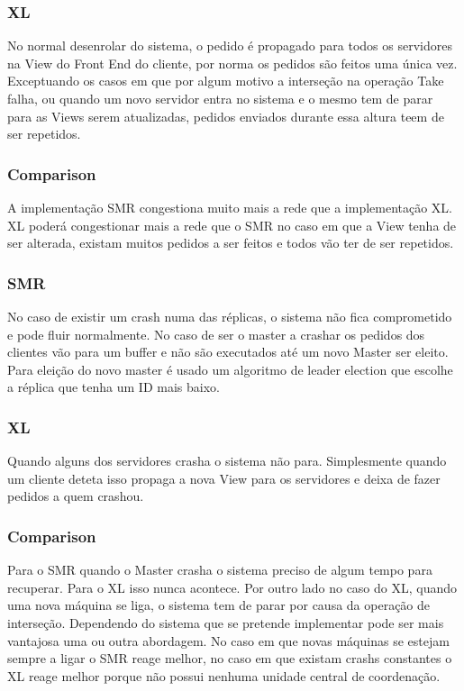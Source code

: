 \documentclass[times, 10pt,twocolumn]{article}
\begin{document}
\subsubsection{XL}

No normal desenrolar do sistema, o pedido é propagado para todos os servidores na View do Front End do cliente, por norma os pedidos são feitos
uma única vez. Exceptuando os casos em que por algum motivo a interseção na operação Take falha, ou quando um novo servidor entra no sistema e 
o mesmo tem de parar para as Views serem atualizadas, pedidos enviados durante essa altura teem de ser repetidos.

\subsubsection{Comparison}

A implementação SMR congestiona muito mais a rede que a implementação XL. XL poderá congestionar mais a rede que o SMR no caso em que
a View tenha de ser alterada, existam muitos pedidos a ser feitos e todos vão ter de ser repetidos. 

\subsubsection{SMR}

No caso de existir um crash numa das réplicas, o sistema não fica comprometido e pode fluir normalmente. No caso de ser o master a crashar
os pedidos dos clientes vão para um buffer e não são executados até um novo Master ser eleito. Para eleição do novo master é usado um algoritmo
de leader election que escolhe a réplica que tenha um ID mais baixo.

\subsubsection{XL}

Quando alguns dos servidores crasha o sistema não para. Simplesmente quando um cliente deteta isso propaga a nova View para os servidores e 
deixa de fazer pedidos a quem crashou.

\subsubsection{Comparison}

Para o SMR quando o Master crasha o sistema preciso de algum tempo para recuperar. Para o XL isso nunca acontece. Por outro lado no caso do XL,
quando uma nova máquina se liga, o sistema tem de parar por causa da operação de interseção.
Dependendo do sistema que se pretende implementar pode ser mais vantajosa uma ou outra abordagem. No caso em que novas máquinas se estejam sempre
a ligar o SMR reage melhor, no caso em que existam crashs constantes o XL reage melhor porque não possui nenhuma unidade central de coordenação. 
\end{document}
